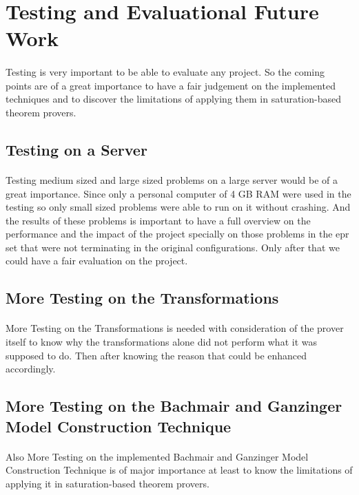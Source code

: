 		
	\section{Testing and Evaluational Future Work}\label{sec:c7s2}
		\paragraph{ }
		Testing is very important to be able to evaluate any project. So the coming points are of a great importance to have a fair judgement on the implemented techniques and to discover the limitations of applying them in saturation-based theorem provers.
		
		\subsection{Testing on a Server}\label{sub:c7s2s1}
			\paragraph{ }
			Testing medium sized and large sized problems on a large server would be of a great importance. Since only a personal computer of 4 GB RAM were used in the testing so only small sized problems were able to run on it without crashing. And the results of these problems is important to have a full overview on the performance and the impact of the project specially on those problems in the \ac{epr} set that were not terminating in the original configurations. Only after that we could have a fair evaluation on the project.  
		
		\subsection{More Testing on the Transformations}\label{sub:c7s2s2}
			\paragraph{ }
			More Testing on the Transformations is needed with consideration of the prover itself to know why the transformations alone did not perform what it was supposed to do. Then after knowing the reason that could be enhanced accordingly.
		
		\subsection{More Testing on the Bachmair and Ganzinger Model Construction Technique}\label{sub:c7s2s3}
			\paragraph{ }
			Also More Testing on the implemented Bachmair and Ganzinger Model Construction Technique is of major importance at least to know the limitations of applying it in saturation-based theorem provers. 		
		
		
		
		
		
		
		
		
		
		
		
		
		
		
		
		
		

